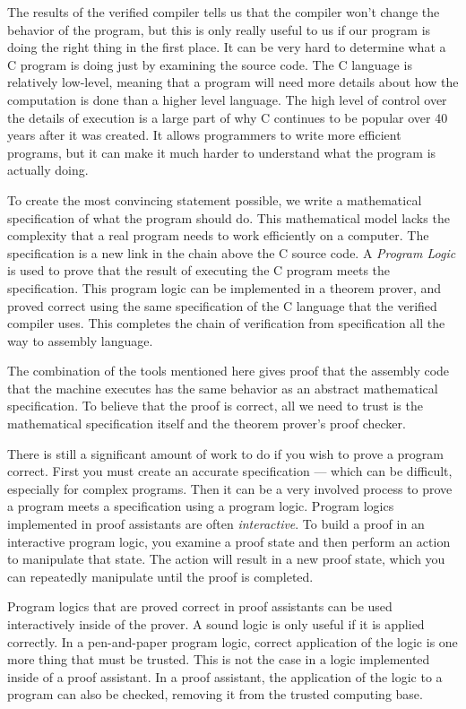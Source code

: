 \documentclass{puthesis}
\begin{document}
The results of the verified compiler tells us that the compiler won't
change the behavior of the program, but this is only really useful to
us if our program is doing the right thing in the first place. It can
be very hard to determine what a C program is doing just by examining
the source code. The C language is relatively
low-level, meaning that a program will need more details about how the
computation is done than a higher level language. The high level of
control over the details of execution is a large part of why C
continues to be popular over 40 years after it was created. It allows
programmers to write more efficient programs, but it can make it much
harder to understand what the program is actually doing.

To create the most convincing statement possible, we write a
mathematical specification of what the program should do. This
mathematical model lacks the complexity that a real program needs to
work efficiently on a computer.  The specification is a new link in
the chain above the C source code. A \emph{Program Logic} is used to
prove that the result of executing the C program meets the
specification. This program logic can be implemented in a theorem
prover, and proved correct using the same specification of the C
language that the verified compiler uses. This completes the chain of
verification from specification all the way to assembly language. 

The combination of the tools mentioned here gives proof that the
assembly code that the machine executes has the same behavior as an
abstract mathematical specification. To believe that the proof is
correct, all we need to trust is the mathematical specification itself
and the theorem prover's proof checker.

There is still a significant amount of work to do if you wish to prove
a program correct. First you must create an accurate specification ---
which can be difficult, especially for complex programs. Then it can
be a very involved process to prove a program meets a specification
using a program logic. Program logics implemented in proof assistants
are often \emph{interactive}. To build a proof in an interactive
program logic, you examine a proof state and then perform an action to
manipulate that state. The action will result in a new proof state,
which you can repeatedly manipulate until the proof is completed.

Program logics that are proved correct in proof assistants can be used
interactively inside of the prover. A sound logic is only useful if it
is applied correctly. In a pen-and-paper program logic, correct
application of the logic is one more thing that must be trusted. This
is not the case in a logic implemented inside of a proof assistant. In
a proof assistant, the application of the logic to a program can also
be checked, removing it from the trusted computing base.
\end{document}
